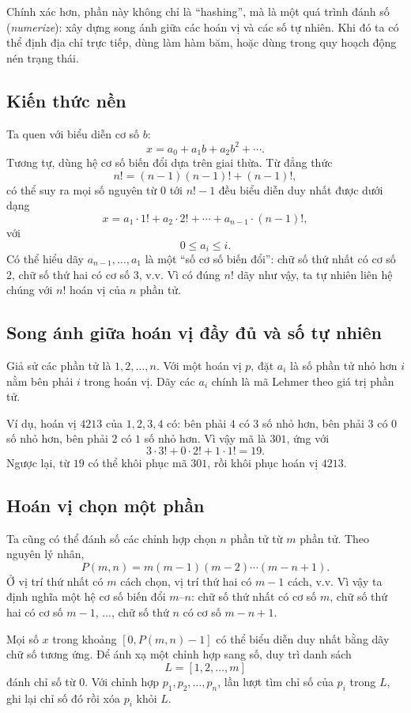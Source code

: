 \documentclass[11pt]{article}
\begin{document}
Chính xác hơn, phần này không chỉ là ``hashing'', mà là một quá trình đánh số
(\textit{numerize}): xây dựng song ánh giữa các hoán vị và các số tự nhiên.
Khi đó ta có thể định địa chỉ trực tiếp, dùng làm hàm băm, hoặc dùng trong
quy hoạch động nén trạng thái.

\subsection{Kiến thức nền}

Ta quen với biểu diễn cơ số $b$:
\[
  x=a_0+a_1b+a_2b^2+\cdots.
\]
Tương tự, dùng hệ cơ số biến đổi dựa trên giai thừa. Từ đẳng thức
\[
  n!=(n-1)(n-1)!+(n-1)!,
\]
có thể suy ra mọi số nguyên từ $0$ tới $n!-1$ đều biểu diễn duy nhất được dưới
dạng
\[
  x=a_1\cdot 1!+a_2\cdot 2!+\cdots+a_{n-1}\cdot (n-1)!,
\]
với
\[
  0\le a_i\le i.
\]
Có thể hiểu dãy $a_{n-1},\ldots,a_1$ là một ``số cơ số biến đổi'': chữ số thứ
nhất có cơ số $2$, chữ số thứ hai có cơ số $3$, v.v. Vì có đúng $n!$ dãy như
vậy, ta tự nhiên liên hệ chúng với $n!$ hoán vị của $n$ phần tử.

\subsection{Song ánh giữa hoán vị đầy đủ và số tự nhiên}

Giả sử các phần tử là $1,2,\ldots,n$. Với một hoán vị $p$, đặt $a_i$ là số
phần tử nhỏ hơn $i$ nằm bên phải $i$ trong hoán vị. Dãy các $a_i$ chính là mã
Lehmer theo giá trị phần tử.

Ví dụ, hoán vị $4213$ của $1,2,3,4$ có: bên phải $4$ có $3$ số nhỏ hơn, bên
phải $3$ có $0$ số nhỏ hơn, bên phải $2$ có $1$ số nhỏ hơn. Vì vậy mã là
$301$, ứng với
\[
  3\cdot 3!+0\cdot 2!+1\cdot 1!=19.
\]
Ngược lại, từ $19$ có thể khôi phục mã $301$, rồi khôi phục hoán vị $4213$.

\subsection{Hoán vị chọn một phần}

Ta cũng có thể đánh số các chỉnh hợp chọn $n$ phần tử từ $m$ phần tử. Theo
nguyên lý nhân,
\[
  P(m,n)=m(m-1)(m-2)\cdots(m-n+1).
\]
Ở vị trí thứ nhất có $m$ cách chọn, vị trí thứ hai có $m-1$ cách, v.v. Vì vậy
ta định nghĩa một hệ cơ số biến đổi $m$--$n$: chữ số thứ nhất có cơ số $m$,
chữ số thứ hai có cơ số $m-1$, ..., chữ số thứ $n$ có cơ số $m-n+1$.

Mọi số $x$ trong khoảng $[0,P(m,n)-1]$ có thể biểu diễn duy nhất bằng dãy chữ
số tương ứng. Để ánh xạ một chỉnh hợp sang số, duy trì danh sách
\[
  L=[1,2,\ldots,m]
\]
đánh chỉ số từ $0$. Với chỉnh hợp $p_1,p_2,\ldots,p_n$, lần lượt tìm chỉ số
của $p_i$ trong $L$, ghi lại chỉ số đó rồi xóa $p_i$ khỏi $L$.
\end{document}
